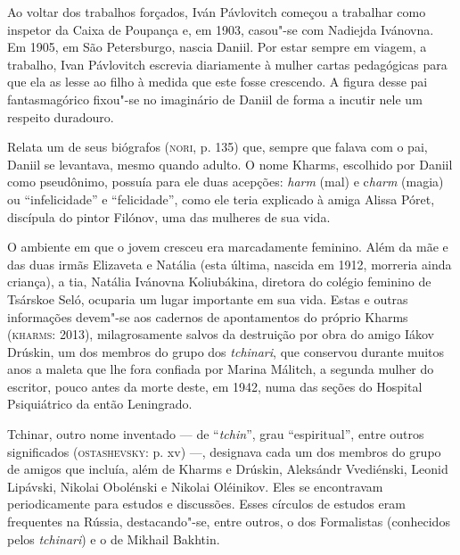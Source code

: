 Ao voltar dos trabalhos forçados, Iván Pávlovitch começou a trabalhar
como inspetor da Caixa de Poupança e, em 1903, casou"-se com Nadiejda
Ivánovna. Em 1905, em São Petersburgo, nascia Daniil. Por estar sempre
em viagem, a trabalho, Ivan Pávlovitch escrevia diariamente à mulher
cartas pedagógicas para que ela as lesse ao filho à medida que este
fosse crescendo. A figura desse pai fantasmagórico fixou"-se no
imaginário de Daniil de forma a incutir nele um respeito duradouro.

Relata um de seus biógrafos (\textsc{nori}, p. 135) que, sempre que
falava com o pai, Daniil se levantava, mesmo quando adulto. O nome
Kharms, escolhido por Daniil como pseudônimo, possuía para ele duas
acepções: \emph{harm} (mal) e c\emph{harm} (magia) ou ``infelicidade'' e
``felicidade'', como ele teria explicado à amiga Alissa Póret, discípula
do pintor Filónov, uma das mulheres de sua vida.

O ambiente em que o jovem cresceu era marcadamente feminino. Além da mãe
e das duas irmãs Elizaveta e Natália (esta última, nascida em 1912,
morreria ainda criança), a tia, Natália Ivánovna Koliubákina, diretora
do colégio feminino de Tsárskoe Seló, ocuparia um lugar importante em
sua vida. Estas e outras informações devem"-se aos cadernos de
apontamentos do próprio Kharms (\textsc{kharms}: 2013), milagrosamente
salvos da destruição por obra do amigo Iákov Drúskin, um dos membros do
grupo dos \emph{tchinari}, que conservou durante muitos anos a maleta
que lhe fora confiada por Marina Málitch, a segunda mulher do escritor,
pouco antes da morte deste, em 1942, numa das seções do Hospital
Psiquiátrico da então Leningrado.

Tchinar, outro nome inventado --- de ``\emph{tchin}'', grau
``espiritual'', entre outros significados (\textsc{ostashevsky}: p. xv)
---, designava cada um dos membros do grupo de amigos que incluía, além
de Kharms e Drúskin, Aleksándr Vvediénski, Leonid Lipávski, Nikolai
Obolénski e Nikolai Oléinikov. Eles se encontravam periodicamente para
estudos e discussões. Esses círculos de estudos eram frequentes na
Rússia, destacando"-se, entre outros, o dos Formalistas (conhecidos pelos
\emph{tchinari}) e o de Mikhail Bakhtin.

